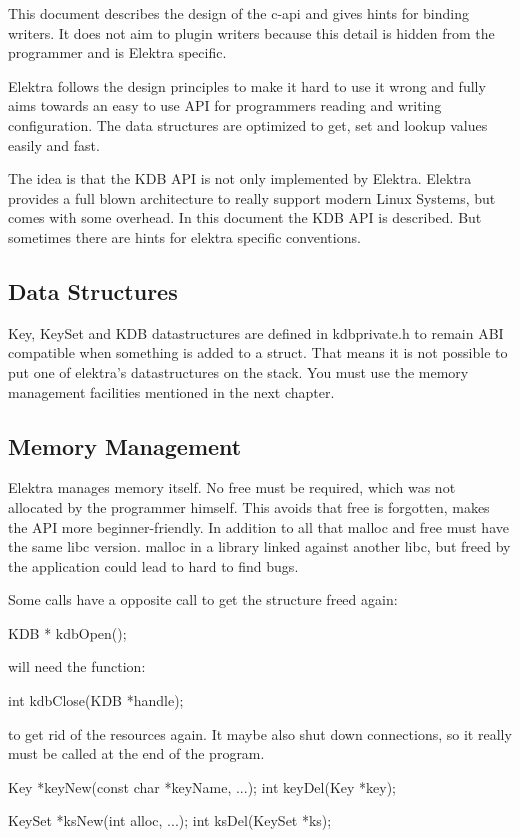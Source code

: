This document describes the design of the c-\/api and gives hints for binding writers. It does not aim to plugin writers because this detail is hidden from the programmer and is Elektra specific.

Elektra follows the design principles to make it hard to use it wrong and fully aims towards an easy to use A\+P\+I for programmers reading and writing configuration. The data structures are optimized to get, set and lookup values easily and fast.

The idea is that the K\+D\+B A\+P\+I is not only implemented by Elektra. Elektra provides a full blown architecture to really support modern Linux Systems, but comes with some overhead. In this document the K\+D\+B A\+P\+I is described. But sometimes there are hints for elektra specific conventions.

\subsection*{Data Structures}

Key, Key\+Set and K\+D\+B datastructures are defined in kdbprivate.\+h to remain A\+B\+I compatible when something is added to a struct. That means it is not possible to put one of elektra's datastructures on the stack. You must use the memory management facilities mentioned in the next chapter.

\subsection*{Memory Management}

Elektra manages memory itself. No free must be required, which was not allocated by the programmer himself. This avoids that free is forgotten, makes the A\+P\+I more beginner-\/friendly. In addition to all that malloc and free must have the same libc version. malloc in a library linked against another libc, but freed by the application could lead to hard to find bugs.

Some calls have a opposite call to get the structure freed again\+: \begin{DoxyVerb}KDB * kdbOpen();
\end{DoxyVerb}
 will need the function\+: \begin{DoxyVerb}    int kdbClose(KDB *handle);
\end{DoxyVerb}
 to get rid of the resources again. It maybe also shut down connections, so it really must be called at the end of the program. \begin{DoxyVerb}    Key *keyNew(const char *keyName, ...);
    int keyDel(Key *key);

    KeySet *ksNew(int alloc, ...);
    int ksDel(KeySet *ks);
\end{DoxyVerb}


